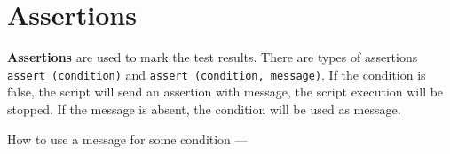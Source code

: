 \section{Assertions}

{\bf Assertions} are used to mark the test results. There are types of assertions \texttt{assert (condition)} and \texttt{assert (condition, message)}. If the condition is false, the script will send an assertion with message, the script execution will be stopped. If the message is absent, the condition will be used as message.

How to use a message for some condition —
\inputminted[linenos]{icl}{../sources/assertexample.icL}
